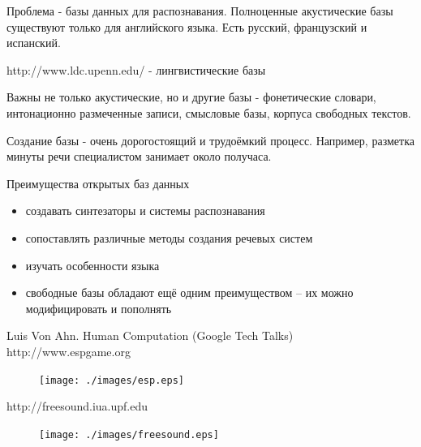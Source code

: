 \documentclass{seminar}
\begin{document}
\begin{slide}

Проблема - базы данных для распознавания. Полноценные акустические базы существуют только
для английского языка. Есть русский, французский и испанский. 

http://www.ldc.upenn.edu/ - лингвистические базы

Важны не только акустические, но и другие базы - фонетические словари, 
интонационно размеченные записи, смысловые базы, корпуса свободных текстов.

Создание базы - очень дорогостоящий и трудоёмкий процесс. Например, разметка
минуты речи специалистом занимает около получаса.

\end{slide}

\begin{slide}

Преимущества открытых баз данных

\begin{itemize}
\item создавать синтезаторы и системы распознавания
\item сопоставлять различные методы создания речевых систем
\item изучать особенности языка
\item свободные базы обладают ещё одним преимуществом -- их можно модифицировать и пополнять
\end{itemize}
\end{slide}

\begin{slide}
Luis Von Ahn. Human Computation (Google Tech Talks) http://www.espgame.org
\begin{figure}
\begin{center}
\texttt{[image: ./images/esp.eps]}
\end{center}
\end{figure}

\end{slide}

\begin{slide}

http://freesound.iua.upf.edu

\begin{figure}
\begin{center}
\texttt{[image: ./images/freesound.eps]}
\end{center}
\end{figure}

\end{slide}
\end{document}
